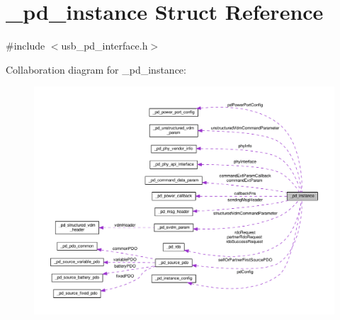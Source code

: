 \hypertarget{struct__pd__instance}{\section{\-\_\-pd\-\_\-instance Struct Reference}
\label{struct__pd__instance}
}


{\ttfamily \#include $<$usb\-\_\-pd\-\_\-interface.\-h$>$}



Collaboration diagram for \-\_\-pd\-\_\-instance\-:
\nopagebreak
\begin{figure}[H]
\begin{center}
\leavevmode
\includegraphics[width=350pt]{struct__pd__instance__coll__graph}
\end{center}
\end{figure}
